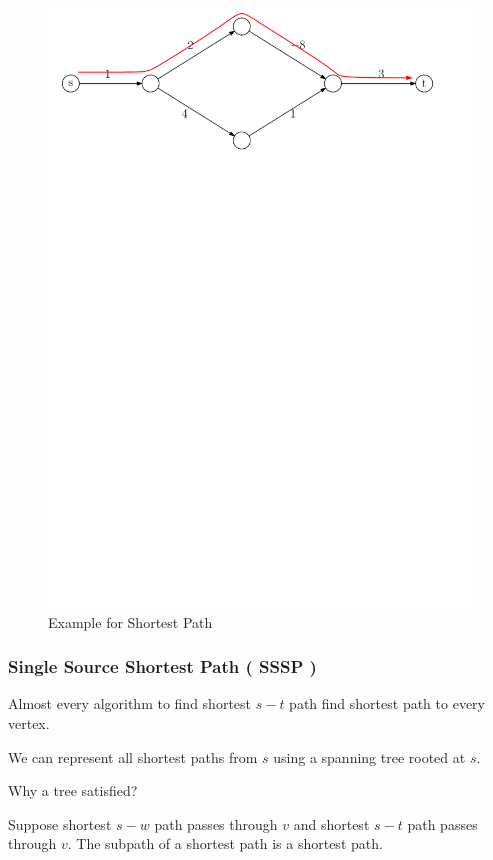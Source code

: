 \begin{figure}[ht!]
    \caption{Example for Shortest Path}\label{fig:spexample}
    \centering
    \includegraphics[width=.9\linewidth]{fig/spExample}
\end{figure}

\subsubsection{Single Source Shortest Path ( SSSP )}
Almost every algorithm to find shortest $s-t$ path find
shortest path to every vertex. 

We can represent all shortest paths from $s$ using
a spanning tree rooted at $s$.

Why a tree satisfied?

Suppose shortest $s-w$ path passes through $v$
and shortest $s-t$ path passes through $v$.
The subpath of a shortest path is a shortest path.
